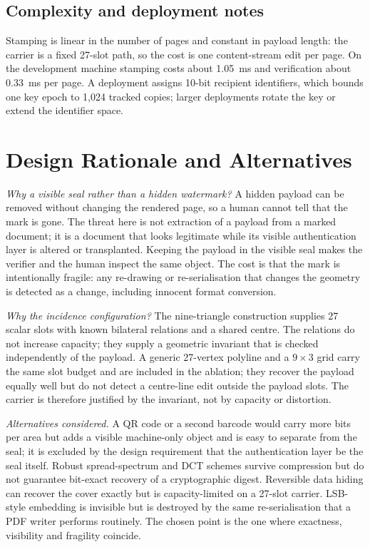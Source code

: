 \documentclass[journal]{IEEEtran}
\begin{document}
\subsection{Complexity and deployment notes}
Stamping is linear in the number of pages and constant in payload length: the carrier is a fixed 27-slot path, so the cost is one content-stream edit per page. On the development machine stamping costs about 1.05~ms and verification about 0.33~ms per page. A deployment assigns 10-bit recipient identifiers, which bounds one key epoch to 1{,}024 tracked copies; larger deployments rotate the key or extend the identifier space.


\section{Design Rationale and Alternatives}
\emph{Why a visible seal rather than a hidden watermark?} A hidden payload can be removed without changing the rendered page, so a human cannot tell that the mark is gone. The threat here is not extraction of a payload from a marked document; it is a document that looks legitimate while its visible authentication layer is altered or transplanted. Keeping the payload in the visible seal makes the verifier and the human inspect the same object. The cost is that the mark is intentionally fragile: any re-drawing or re-serialisation that changes the geometry is detected as a change, including innocent format conversion.

\emph{Why the incidence configuration?} The nine-triangle construction supplies 27 scalar slots with known bilateral relations and a shared centre. The relations do not increase capacity; they supply a geometric invariant that is checked independently of the payload. A generic 27-vertex polyline and a $9\times3$ grid carry the same slot budget and are included in the ablation; they recover the payload equally well but do not detect a centre-line edit outside the payload slots. The carrier is therefore justified by the invariant, not by capacity or distortion.

\emph{Alternatives considered.} A QR code or a second barcode would carry more bits per area but adds a visible machine-only object and is easy to separate from the seal; it is excluded by the design requirement that the authentication layer be the seal itself. Robust spread-spectrum and DCT schemes \cite{cox1997,cox2008book} survive compression but do not guarantee bit-exact recovery of a cryptographic digest. Reversible data hiding \cite{tian2003,ni2006,thodi2007} can recover the cover exactly but is capacity-limited on a 27-slot carrier. LSB-style embedding is invisible but is destroyed by the same re-serialisation that a PDF writer performs routinely. The chosen point is the one where exactness, visibility and fragility coincide.
\end{document}
